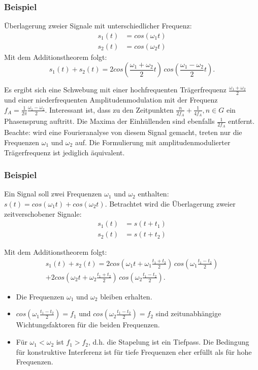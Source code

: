 \subsubsection*{Beispiel}
Überlagerung zweier Signale mit unterschiedlicher Frequenz:
\begin{align*}
s_1(t) & =cos(\omega_1 t)\\
s_2(t) &=cos(\omega_2 t)
\end{align*}
Mit dem Additionstheorem folgt:
\begin{equation}
s_1(t)+s_2(t)= 2 cos\left(\frac{\omega_1+\omega_2}{2}t\right)\,cos\left(\frac{\omega_1-\omega_2}{2}t\right).
\end{equation}

Es ergibt sich eine Schwebung mit einer hochfrequenten Trägerfrequenz $\frac{\omega_1+\omega_2}{2}$ und einer niederfrequenten Amplitudenmodulation mit der Frequenz $f_A = \frac{1}{2\pi}\frac{\omega_1-\omega_2}{2}$. Interessant ist, dass zu den Zeitpunkten $\frac{n}{2f_A}+\frac{1}{4f_A}, n \in G$ ein Phasensprung auftritt. Die Maxima der Einhüllenden sind ebenfalls $\frac{1}{2f_A}$ entfernt. Beachte: wird eine Fourieranalyse von diesem Signal gemacht, treten nur die Frequenzen $\omega_1$ und $\omega_2$ auf. Die Formulierung mit amplitudenmodulierter Trägerfrequenz ist jediglich äquivalent.\\ 

\subsubsection*{Beispiel}
Ein Signal soll zwei Frequenzen $\omega_1$ und $\omega_2$ enthalten: $s(t) = cos(\omega_1t) + cos(\omega_2t)$. Betrachtet wird die Überlagerung zweier zeitverschobener Signale:
\begin{align*}
s_1(t) &=s(t+t_1)\\
s_2(t) &=s(t+t_2)
\end{align*}

Mit dem Additionstheorem folgt:
\begin{multline}
s_1(t)+s_2(t)= 2 cos\left(\omega_1 t +\omega_1\frac{t_1+t_2}{2}\right)\,cos\left(\omega_1\frac{t_1-t_2}{2}\right)\\
+2 cos\left(\omega_2 t +\omega_2\frac{t_1+t_2}{2}\right)\,cos\left(\omega_2\frac{t_1-t_2}{2}\right).
\end{multline}

\begin{itemize}
\item Die Frequenzen $\omega_1$ und $\omega_2$ bleiben erhalten.
\item $cos(\omega_1\frac{t_1-t_2}{2})=f_1$ und $cos(\omega_2\frac{t_1-t_2}{2})=f_2$ sind zeitunabhängige Wichtungsfaktoren für die beiden Frequenzen.
\item Für $\omega_1<\omega_2$ ist $f_1>f_2$, d.h. die Stapelung ist ein Tiefpass. Die Bedingung für konstruktive Interferenz ist für tiefe Frequenzen eher erfüllt als für hohe Frequenzen. 
\end{itemize}


